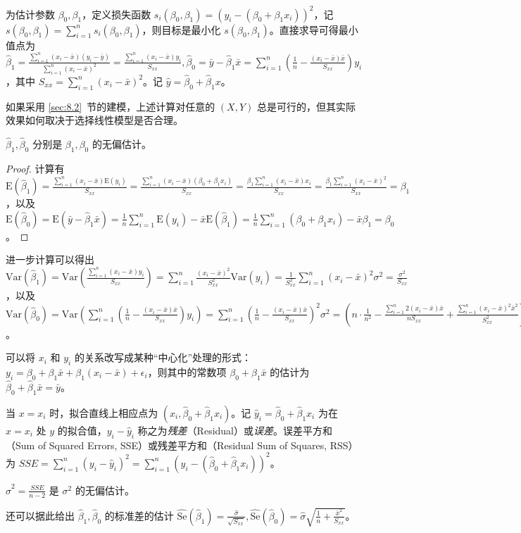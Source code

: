 \documentclass[../main.tex]{subfiles}
\begin{document}
为估计参数 $\beta_0,\beta_1$，定义损失函数 $s_i(\beta_0,\beta_1)=(y_i-(\beta_0+\beta_1x_i))^2$，记 $s(\beta_0,\beta_1)=\sum_{i=1}^ns_i(\beta_0,\beta_1)$，则目标是最小化 $s(\beta_0,\beta_1)$。直接求导可得最小值点为 $\hat\beta_1=\frac{\sum_{i=1}^n(x_i-\bar x)(y_i-\bar y)}{\sum_{i=1}^n(x_i-\bar x)^2}=\frac{\sum_{i=1}^n(x_i-\bar x)y_i}{S_{xx}},\hat\beta_0=\bar y-\hat\beta_1\bar x=\sum_{i=1}^n(\frac1n-\frac{(x_i-\bar x)\bar x}{S_{xx}})y_i$，其中 $S_{xx}=\sum_{i=1}^n(x_i-\bar x)^2$。记 $\hat y=\hat\beta_0+\hat\beta_1x$。

如果采用 \ref{sec:8.2}~节的建模，上述计算对任意的 $(X,Y)$ 总是可行的，但其实际效果如何取决于选择线性模型是否合理。

\begin{proposition}
    $\hat\beta_1,\hat\beta_0$ 分别是 $\beta_1,\beta_0$ 的无偏估计。
\end{proposition}

\begin{proof}
    计算有 $\mathrm E(\hat\beta_1)=\frac{\sum_{i=1}^n(x_i-\bar x)\mathrm E(y_i)}{S_{xx}}=\frac{\sum_{i=1}^n(x_i-\bar x)(\beta_0+\beta_1x_i)}{S_{xx}}=\frac{\beta_1\sum_{i=1}^n(x_i-\bar x)x_i}{S_{xx}}=\frac{\beta_1\sum_{i=1}^n(x_i-\bar x)^2}{S_{xx}}=\beta_1$，以及 $\mathrm E(\hat\beta_0)=\mathrm E(\bar y-\hat\beta_1\bar x)=\frac1n\sum_{i=1}^n\mathrm E(y_i)-\bar x\mathrm E(\hat\beta_1)=\frac1n\sum_{i=1}^n(\beta_0+\beta_1x_i)-\bar x\beta_1=\beta_0$。
\end{proof}

进一步计算可以得出 $\mathrm{Var}(\hat\beta_1)=\mathrm{Var}\left(\frac{\sum_{i=1}^n(x_i-\bar x)y_i}{S_{xx}}\right)=\sum_{i=1}^n\frac{(x_i-\bar x)^2}{S_{xx}^2}\mathrm{Var}(y_i)=\frac1{S_{xx}^2}\sum_{i=1}^n(x_i-\bar x)^2\sigma^2=\frac{\sigma^2}{S_{xx}}$，以及 $\mathrm{Var}(\hat\beta_0)=\mathrm{Var}(\sum_{i=1}^n(\frac1n-\frac{(x_i-\bar x)\bar x}{S_{xx}})y_i)=\sum_{i=1}^n(\frac1n-\frac{(x_i-\bar x)\bar x}{S_{xx}})^2\sigma^2=(n\cdot\frac1{n^2}-\frac{\sum_{i=1}^n2(x_i-\bar x)\bar x}{nS_{xx}}+\frac{\sum_{i=1}^n(x_i-\bar x)^2\bar x^2}{S_{xx}^2})\sigma^2=(\frac1n+\frac{\bar x^2}{S_{xx}})\sigma^2=\frac{\sigma^2}{S_{xx}}\frac{\sum_{i=1}^nx_i^2}{n}$。

可以将 $x_i$ 和 $y_i$ 的关系改写成某种“中心化”处理的形式：$y_i=\beta_0+\beta_1\bar x+\beta_1(x_i-\bar x)+\epsilon_i$，则其中的常数项 $\beta_0+\beta_1\bar x$ 的估计为 $\hat\beta_0+\hat\beta_1\bar x=\bar y$。

当 $x=x_i$ 时，拟合直线上相应点为 $(x_i,\hat\beta_0+\hat\beta_1x_i)$。记 $\hat y_i=\hat\beta_0+\hat\beta_1x_i$ 为在 $x=x_i$ 处 $y$ 的拟合值，$y_i-\hat y_i$ 称之为\emph{残差}（Residual）或\emph{误差}。误差平方和（Sum of Squared Errors, SSE）或残差平方和（Residual Sum of Squares, RSS）为 $SSE=\sum_{i=1}^n(y_i-\hat y_i)^2=\sum_{i=1}^n(y_i-(\hat\beta_0+\hat\beta_1x_i))^2$。

\begin{proposition}
    $\hat\sigma^2=\frac{SSE}{n-2}$ 是 $\sigma^2$ 的无偏估计。
\end{proposition}

还可以据此给出 $\hat\beta_1,\hat\beta_0$ 的标准差的估计 $\widehat{\mathrm{Se}}(\hat\beta_1)=\frac{\hat\sigma}{\sqrt{S_{xx}}},\widehat{\mathrm{Se}}(\hat\beta_0)=\hat\sigma\sqrt{\frac1n+\frac{\bar x^2}{S_{xx}}}$。
\end{document}
